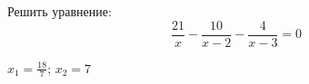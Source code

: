 \begin{ex}
	Решить уравнение:
	$$ \dfrac{21}{x}-\dfrac{10}{x-2}-\dfrac{4}{x-3}=0 $$
	\begin{answer}
		$x_1=\frac{18}{7}$; $x_2=7$
	\end{answer}
\end{ex}